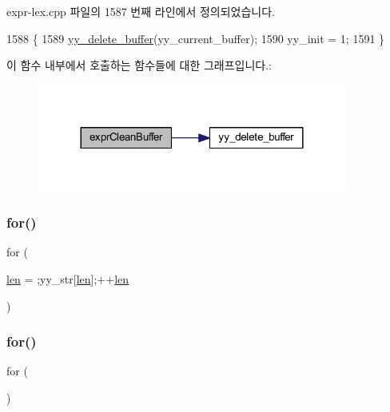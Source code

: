 expr-\/lex.\+cpp 파일의 1587 번째 라인에서 정의되었습니다.


\begin{DoxyCode}
1588 \{
1589   \mbox{\hyperlink{expr-lex_8cpp_a05a39a25571bbcfcf45a1e04a8c24f9b}{yy\_delete\_buffer}}(yy\_current\_buffer);
1590   yy\_init = 1;
1591 \}
\end{DoxyCode}
이 함수 내부에서 호출하는 함수들에 대한 그래프입니다.\+:
\nopagebreak
\begin{figure}[H]
\begin{center}
\leavevmode
\includegraphics[width=288pt]{expr-lex_8cpp_a656fdf035cf4adb57d73e9cc5377d1b5_cgraph}
\end{center}
\end{figure}
\mbox{\label{expr-lex_8cpp_aa656b692c972ef767f6fe691b696c978}} 
\subsubsection{\texorpdfstring{for()}{for()}\hspace{0.1cm}{\footnotesize\ttfamily [1/2]}}
{\footnotesize\ttfamily for (\begin{DoxyParamCaption}\item[{\mbox{\hyperlink{expr-lex_8cpp_afed088663f8704004425cdae2120b9b3}{len}}}]{ = {;yy\+\_\+str\mbox{[}\mbox{\hyperlink{expr-lex_8cpp_afed088663f8704004425cdae2120b9b3}{len}}\mbox{]};++\mbox{\hyperlink{expr-lex_8cpp_afed088663f8704004425cdae2120b9b3}{len}}} }\end{DoxyParamCaption})}

\mbox{\label{expr-lex_8cpp_a2732ab74fa0237854c2ba0f75f88a624}} 
\subsubsection{\texorpdfstring{for()}{for()}\hspace{0.1cm}{\footnotesize\ttfamily [2/2]}}
{\footnotesize\ttfamily for (\begin{DoxyParamCaption}{ }\end{DoxyParamCaption})}

